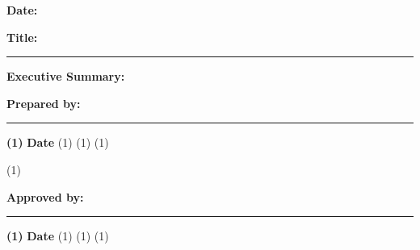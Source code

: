 {   \vspace{0.35in}

   \textbf{Date:}  \@docDate \hfill {} 

   \textbf{Title:} \@docTitle

   \vspace{12pt} \hrule height 2pt \vspace{6pt}

   \textbf{Executive Summary:}

   \@docAbstract
   
   \vfill
   
   \begin{minipage}{.48\textwidth}%
      \textbf{Prepared by:} \vspace{6pt}

      \vspace{6pt} \hrule \vspace{5pt}
      \small\textbf{\docAuthorName(1)} \hfill \textbf{Date} \break
      \docAuthorPosition(1) \hfill \break
      \docAuthorOrganization(1) \hfill \break
      \docAuthorLocation(1) \hfill 
      \end{minipage}%
      \begin{minipage}{.01\textwidth}%
      \hfill
   \end{minipage}%
   \checkdocApproverName(1)
   \ifemptydata
   \else
      \begin{minipage}{.48\textwidth}%
         \textbf{Approved by:} \vspace{6pt}
         
         \vspace{6pt} \hrule \vspace{5pt}
         \small\textbf{\docApproverName(1)} \hfill \textbf{Date} \break
         \docApproverPosition(1) \hfill \break
         \docApproverOrganization(1) \hfill \break
         \docApproverLocation(1) \hfill 
         \end{minipage}%
         \begin{minipage}{.01\textwidth}%
         \hfill
      \end{minipage}%
   \fi

}
